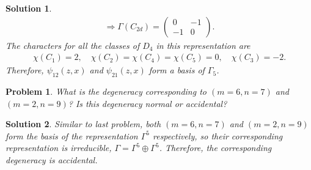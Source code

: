 \documentclass[UTF8,10pt,a4paper]{article}
\theoremstyle{Problem}
\newtheorem{prob}{Problem}
\theoremstyle{Solution}
\newtheorem*{sol}{Solution}
\begin{document}
\begin{sol}
\begin{gather}
        \Longrightarrow\Gamma(C_{2d})=\left(\begin{matrix}
            0&-1\\
            -1&0
        \end{matrix}\right).
    \end{gather}
    The characters for all the classes of $D_4$ in this representation are
    \begin{align}
        \chi(C_1)=2,\quad\chi(C_2)=\chi(C_4)=\chi(C_5)=0,\quad\chi(C_3)=-2.
    \end{align}
    Therefore, $\psi_{12}(z,x)$ and $\psi_{21}(z,x)$ form a basis of $\Gamma_5$.
\end{sol}

\begin{prob}
    What is the degeneracy corresponding to $(m=6,n=7)$ and $(m=2,n=9)$? Is this degeneracy normal or accidental?
\end{prob}
\begin{sol}
    Similar to last problem, both $(m=6,n=7)$ and $(m=2,n=9)$ form the basis of the representation $\Gamma^5$ respectively, so their corresponding representation is irreducible, $\Gamma=\Gamma^5\oplus\Gamma^5$. Therefore, the corresponding degeneracy is accidental.
\end{sol}
\end{document}
